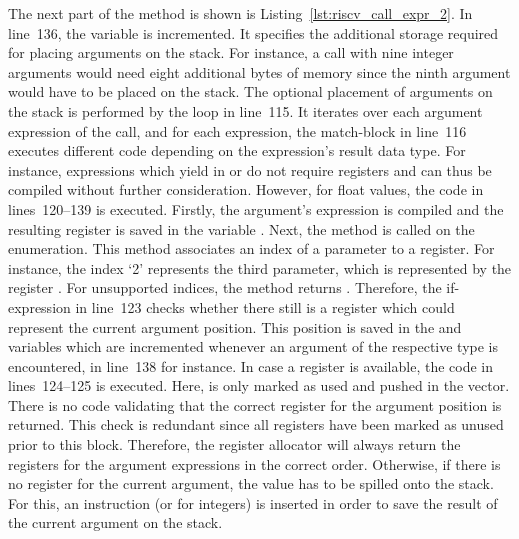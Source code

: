 
The next part of the  method is shown is Listing~\ref{lst:riscv_call_expr_2}.
In line~136, the  variable is incremented.
It specifies the additional storage required for placing arguments on the stack.
For instance, a call with nine integer arguments would need eight additional bytes of memory since the ninth argument would have to be placed on the stack.
The optional placement of arguments on the stack is performed by the loop in line~115.
It iterates over each argument expression of the call, and for each expression, the match-block in line~116 executes different code depending on the expression's result data type.
For instance, expressions which yield in \qVerb{()} or \qVerb{!} do not require registers and can thus be compiled without further consideration.
However, for float values, the code in lines~120--139 is executed.
Firstly, the argument's expression is compiled and the resulting register is saved in the variable .
Next, the  method is called on the  enumeration.
This method associates an index of a parameter to a register.
For instance, the index `2' represents the third parameter, which is represented by the register .
For unsupported indices, the method returns .
Therefore, the if-expression in line~123 checks whether there still is a register which could represent the current argument position.
This position is saved in the  and  variables which are incremented whenever an argument of the respective type is encountered, in line~138 for instance.
In case a register is available, the code in lines~124--125 is executed.
Here,  is only marked as used and pushed in the  vector.
There is no code validating that the correct register for the argument position is returned.
This check is redundant since all registers have been marked as unused prior to this block.
Therefore, the register allocator will always return the registers for the argument expressions in the correct order.
Otherwise, if there is no register for the current argument, the value has to be spilled onto the stack.
For this, an  instruction (or  for integers) is inserted in order to save the result of the current argument on the stack.
